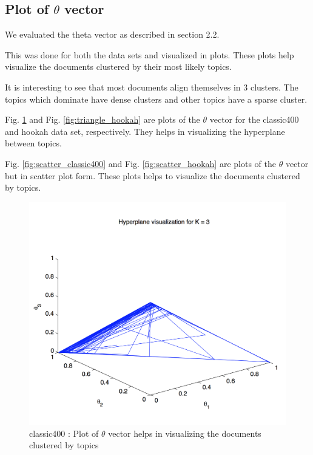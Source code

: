 \documentclass[11pt,a4paper,oneside]{article}
\begin{document}
\subsection{Plot of $\theta$ vector}
We evaluated the theta vector as described in section 2.2.

This was done for both the data sets and visualized in plots. These plots help visualize the documents clustered by their most likely topics. 

It is interesting to see that most documents align themselves in 3 clusters. The topics which dominate have dense clusters and other topics have a sparse cluster.

Fig. \ref{fig:triangle_classic400} and Fig. \ref{fig:triangle_hookah} are plots of the $\theta$ vector for the classic400 and hookah data set, respectively. They helps in visualizing the hyperplane between topics. 

Fig. \ref{fig:scatter_classic400} and Fig. \ref{fig:scatter_hookah} are plots of the $\theta$ vector but in scatter plot form. These plots helps to visualize the documents clustered by topics.

\begin{figure}[H]
\centering
\includegraphics[width=\columnwidth]{triangle_classic400}
\caption{classic400 : Plot of $\theta$ vector helps in visualizing the documents clustered by topics}
\label{fig:triangle_classic400}
\end{figure}
\end{document}

